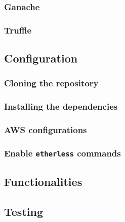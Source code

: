 \subsubsection{Ganache}
\subsubsection{Truffle}
\subsection{Configuration}
\subsubsection{Cloning the repository}
\subsubsection{Installing the dependencies}
\subsubsection{AWS configurations}
\subsubsection{Enable \texttt{etherless} commands}
\subsection{Functionalities}
\subsection{Testing}
